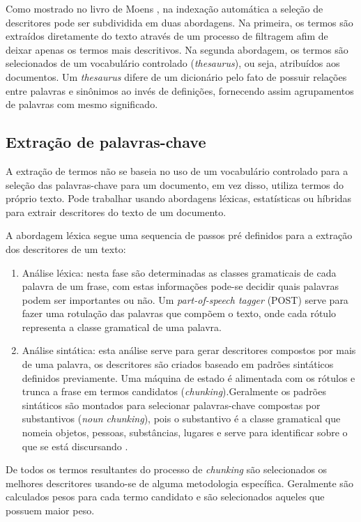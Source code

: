 Como mostrado no livro de Moens \cite{Moens2000}, na indexação automática a seleção de descritores pode ser subdividida em duas abordagens. Na primeira, os termos são extraídos diretamente do texto através de um processo de filtragem afim de deixar apenas os termos mais descritivos. Na segunda abordagem, os termos são selecionados de um vocabulário controlado (\emph{thesaurus}), ou seja, atribuídos aos documentos. Um \emph{thesaurus} difere de um dicionário pelo fato de possuir relações entre palavras e sinônimos ao invés de definições, fornecendo assim agrupamentos de palavras com mesmo significado.
 
\subsection{Extração de palavras-chave}
A extração de termos não se baseia no uso de um vocabulário controlado para a seleção das palavras-chave para um documento, em vez disso, utiliza termos do próprio texto. Pode trabalhar usando abordagens léxicas, estatísticas ou híbridas para extrair descritores do texto de um documento.

A abordagem léxica segue uma sequencia de passos pré definidos para a extração dos descritores de um texto:
\begin{enumerate}
    \item Análise léxica: nesta fase são determinadas as classes gramaticais de cada palavra de um frase, com estas informações pode-se decidir quais palavras podem ser importantes ou não. Um \emph{part-of-speech tagger} (POST) serve para fazer uma rotulação das palavras que compõem o texto, onde cada rótulo representa a classe gramatical de uma palavra.
    \item Análise sintática: esta análise serve para gerar descritores compostos por mais de uma palavra, os descritores são criados baseado em padrões sintáticos definidos previamente. Uma máquina de estado é alimentada com os rótulos e trunca a frase em termos candidatos (\emph{chunking}).Geralmente os padrões sintáticos são montados para selecionar palavras-chave compostas por substantivos (\emph{noun chunking}), pois o substantivo é a classe gramatical que nomeia objetos, pessoas, substâncias, lugares e serve para identificar sobre o que se está discursando \cite{Gucker1966}.
\end{enumerate}
De todos os termos resultantes do processo de \emph{chunking} são selecionados os melhores descritores usando-se de alguma metodologia específica. Geralmente são calculados pesos para cada termo candidato e são selecionados aqueles que possuem maior peso.

